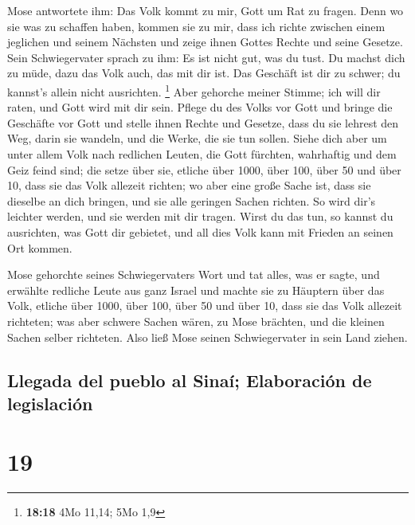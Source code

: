  Mose antwortete ihm: Das Volk kommt zu mir, Gott um Rat
zu fragen.  Denn wo sie was zu schaffen haben, kommen sie
zu mir, dass ich richte zwischen einem jeglichen und seinem Nächsten und
zeige ihnen Gottes Rechte und seine Gesetze.  Sein
Schwiegervater sprach zu ihm: Es ist nicht gut, was du tust.
 Du machst dich zu müde, dazu das Volk auch, das mit dir
ist. Das Geschäft ist dir zu schwer; du kannst's allein nicht
ausrichten. \footnote{\textbf{18:18} 4Mo 11,14; 5Mo 1,9} 
Aber gehorche meiner Stimme; ich will dir raten, und Gott wird mit dir
sein. Pflege du des Volks vor Gott und bringe die Geschäfte vor Gott
 und stelle ihnen Rechte und Gesetze, dass du sie lehrest
den Weg, darin sie wandeln, und die Werke, die sie tun sollen.
 Siehe dich aber um unter allem Volk nach redlichen
Leuten, die Gott fürchten, wahrhaftig und dem Geiz feind sind; die setze
über sie, etliche über 1000, über 100, über 50 und über 10,
 dass sie das Volk allezeit richten; wo aber eine große
Sache ist, dass sie dieselbe an dich bringen, und sie alle geringen
Sachen richten. So wird dir's leichter werden, und sie werden mit dir
tragen.  Wirst du das tun, so kannst du ausrichten, was
Gott dir gebietet, und all dies Volk kann mit Frieden an seinen Ort
kommen.

 Mose gehorchte seines Schwiegervaters Wort und tat
alles, was er sagte,  und erwählte redliche Leute aus
ganz Israel und machte sie zu Häuptern über das Volk, etliche über 1000,
über 100, über 50 und über 10,  dass sie das Volk
allezeit richteten; was aber schwere Sachen wären, zu Mose brächten, und
die kleinen Sachen selber richteten.  Also ließ Mose
seinen Schwiegervater in sein Land ziehen.

\hypertarget{llegada-del-pueblo-al-sinauxed-elaboraciuxf3n-de-legislaciuxf3n}{%
\subsection{Llegada del pueblo al Sinaí; Elaboración de
legislación}\label{llegada-del-pueblo-al-sinauxed-elaboraciuxf3n-de-legislaciuxf3n}}

\hypertarget{section-18}{%
\section{19}\label{section-18}}

